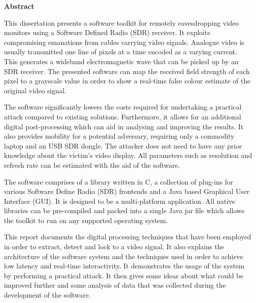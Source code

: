 \newpage
{\Huge \bf Abstract}
\vspace{24pt} 


This dissertation presents a software toolkit for remotely eavesdropping video monitors using a Software Defined Radio (SDR) receiver. It exploits compromising emanations from cables carrying video signals. Analogue video is usually transmitted one line of pixels at a time encoded as a varying current. This generates a wideband electromagnetic wave that can be picked up by an SDR receiver. The presented software can map the received field strength of each pixel to a grayscale value in order to show a real-time false colour estimate of the original video signal.

The software significantly lowers the costs required for undertaking a practical attack compared to existing solutions. Furthermore, it allows for an additional digital post-processing which can aid in analysing and improving the results. It also provides mobility for a potential adversary, requiring only a commodity laptop and an USB SDR dongle. The attacker does not need to have any prior knowledge about the victim's video display. All parameters such as resolution and refresh rate can be estimated with the aid of the software. 

The software comprises of a library written in C, a collection of plug-ins for various Software Define Radio (SDR) frontends and a Java based Graphical User Interface (GUI). It is designed to be a multi-platform application. All native libraries can be pre-compiled and packed into a single Java jar file which allows the toolkit to run on any supported operating system.

This report documents the digital processing techniques that have been employed in order to extract, detect and lock to a video signal. It also explains the architecture of the software system and the techniques used in order to achieve low latency and real-time interactivity. It demonstrates the usage of the system by performing a practical attack. It then gives some ideas about what could be improved further and some analysis of data that was collected during the development of the software.


\newpage
\vspace*{\fill}
